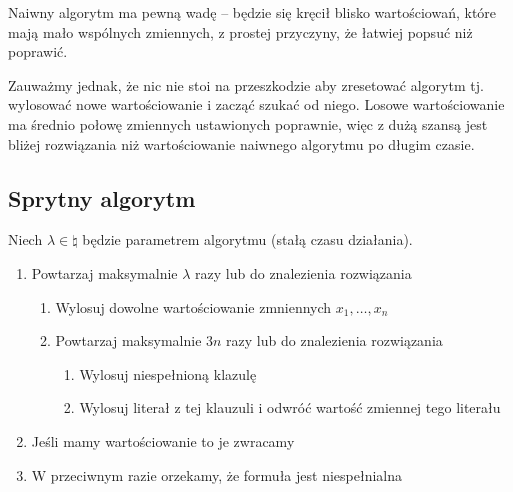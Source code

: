 Naiwny algorytm ma pewną wadę -- będzie się kręcił blisko wartościowań, które mają mało wspólnych zmiennych, z prostej przyczyny, że łatwiej popsuć niż poprawić.

Zauważmy jednak, że nic nie stoi na przeszkodzie aby zresetować algorytm tj. wylosować nowe wartościowanie i zacząć szukać od niego.
Losowe wartościowanie ma średnio połowę zmiennych ustawionych poprawnie, więc z dużą szansą jest bliżej rozwiązania niż wartościowanie naiwnego algorytmu po długim czasie.

\subsection{Sprytny algorytm}
\label{3-sat-better-algorithm}

Niech \( \lambda \in \natural \) będzie parametrem algorytmu (stałą czasu działania).
\begin{enumerate}
    \item Powtarzaj maksymalnie \( \lambda \) razy lub do znalezienia rozwiązania
    \begin{enumerate}
        \item Wylosuj dowolne wartościowanie zmniennych \( x_1, \dots, x_n \)
        \item Powtarzaj maksymalnie \( 3n \) razy lub do znalezienia rozwiązania
        \begin{enumerate}
            \item Wylosuj niespełnioną klazulę
            \item Wylosuj literał z tej klauzuli i odwróć wartość zmiennej tego literału
        \end{enumerate}
    \end{enumerate}
    \item Jeśli mamy wartościowanie to je zwracamy
    \item W przeciwnym razie orzekamy, że formuła jest niespełnialna
\end{enumerate}

